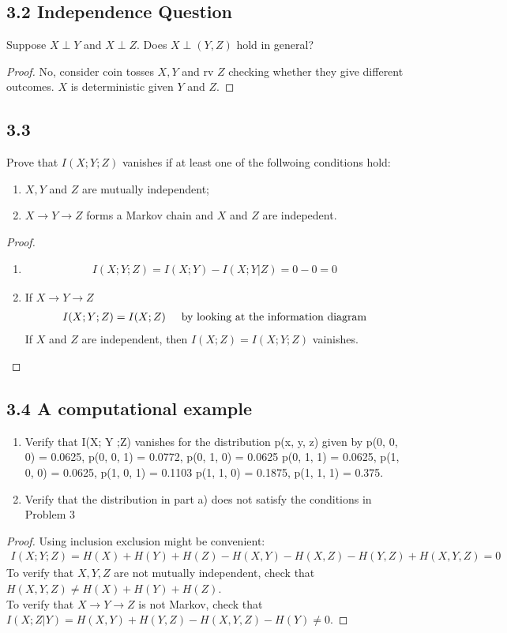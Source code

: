 \documentclass[../main.tex]{subfiles}
\begin{document}
\subsection*{3.2 Independence Question}
Suppose $X\perp Y$ and $X\perp Z$. Does $X\perp (Y,Z)$ hold in general?
\begin{proof}
    No, consider coin tosses $X,Y$ and rv $Z$ checking whether they give different outcomes. $X$ is deterministic given $Y$ and $Z$.
\end{proof}
\subsection*{3.3}
Prove that $I(X;Y;Z)$ vanishes if at least one of the follwoing conditions hold:
\begin{enumerate}
    \item $X,Y$ and $Z$ are mutually independent;
    \item $X\to Y\to Z$ forms a Markov chain and $X$ and $Z$ are indepedent.
    \end{enumerate}
 \begin{proof}
    \begin{enumerate}
        \item \begin{align*}
            I(X;Y;Z)=I(X;Y)-I(X;Y|Z)=0-0=0
        \end{align*}
        \item If $X\to Y\to Z$
        \begin{align*}
        I(X;Y;Z)=I(X;Z) \hspace{5mm}\text{by looking at the information diagram}
        \end{align*}
        If $X$ and $Z$ are independent, then $I(X;Z)=I(X;Y;Z)$ vainishes.
    \end{enumerate}
    \end{proof}
\subsection*{3.4 A computational example}
\begin{enumerate}
    \item Verify that I(X; Y ;Z) vanishes for the distribution p(x, y, z) given
by
p(0, 0, 0) = 0.0625, p(0, 0, 1) = 0.0772, p(0, 1, 0) = 0.0625
p(0, 1, 1) = 0.0625, p(1, 0, 0) = 0.0625, p(1, 0, 1) = 0.1103
p(1, 1, 0) = 0.1875, p(1, 1, 1) = 0.375.
\item Verify that the distribution in part a) does not satisfy the conditions in Problem 3

\end{enumerate}
\begin{proof}
    Using inclusion exclusion might be convenient:\begin{align*}
    I(X;Y;Z)= H(X)+H(Y)+H(Z)-H(X,Y)-H(X,Z)-H(Y,Z)+H(X,Y,Z)=0
    \end{align*}
    To verify that $X, Y, Z$ are not mutually independent, check that
$H(X, Y, Z) \neq H(X) + H(Y ) + H(Z)$.\\
To verify that $X \to Y \to Z$ is not Markov, check that
$I(X;Z|Y)=H(X,Y)+H(Y,Z)-H(X,Y,Z)-H(Y)\neq 0$.
\end{proof}
\end{document}
